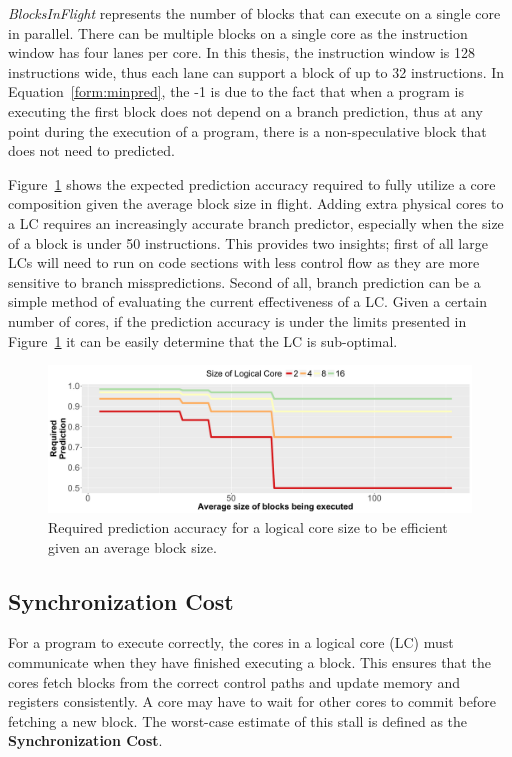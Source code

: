 \textit{BlocksInFlight} represents the number of blocks that can execute on a single core in parallel.
There can be multiple blocks on a single core as the instruction window has four lanes per core.
In this thesis, the instruction window is 128 instructions wide, thus each lane can support a block of up to 32 instructions.
In Equation~\ref{form:minpred}, the -1 is due to the fact that when a program is executing the first block does not depend on a branch prediction, thus at any point during the execution of a program, there is a non-speculative block that does not need to predicted.

Figure~\ref{fig:req_pred} shows the expected prediction accuracy required to fully utilize a core composition given the average block size in flight.
Adding extra physical cores to a LC requires an increasingly accurate branch predictor, especially when the size of a block is under 50 instructions.
This provides two insights; first of all large LCs will need to run on code sections with less control flow as they are more sensitive to branch misspredictions.
Second of all, branch prediction can be a simple method of evaluating the current effectiveness of a LC.
Given a certain number of cores, if the prediction accuracy is under the limits presented in Figure~\ref{fig:req_pred} it can be easily determine that the LC is sub-optimal.

\begin{figure}[t]
    \centering
    \includegraphics[width=\textwidth]{cases-paper/graphics/limit_study/prediction_req.pdf}
    \caption{Required prediction accuracy for a logical core size to be efficient given an average block size.}
    \label{fig:req_pred}
	\vspace{1em}
\end{figure}

\subsection{Synchronization Cost}

For a program to execute correctly, the cores in a logical core (LC) must communicate when they have finished executing a block.
This ensures that the cores fetch blocks from the correct control paths and update memory and registers consistently.
A core may have to wait for other cores to commit before fetching a new block. 
The worst-case estimate of this stall is defined as the \textbf{Synchronization Cost}.


